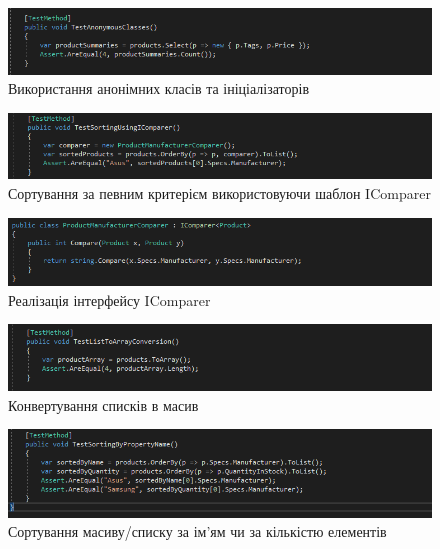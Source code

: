 \documentclass[oneside,14pt]{extarticle}
\begin{document}
\begin{normalsize}
	\begin{figure}[H]
		\centering
		\includegraphics[width=\textwidth]{5}
		\caption{Використання анонімних класів та ініціалізаторів}
	\end{figure}
	
	\begin{figure}[H]
		\centering
		\includegraphics[width=\textwidth]{6}
		\caption{Сортування за певним критерієм використовуючи шаблон IComparer}
	\end{figure}
	
	\begin{figure}[H]
		\centering
		\includegraphics[width=\textwidth]{62}
		\caption{Реалізація інтерфейсу IComparer}
	\end{figure}
	
	\begin{figure}[H]
		\centering
		\includegraphics[width=\textwidth]{7}
		\caption{Конвертування списків в масив}
	\end{figure}
	\begin{figure}[H]
		\centering
		\includegraphics[width=\textwidth]{8}
		\caption{Сортування масиву/списку за ім’ям чи за кількістю елементів}
	\end{figure}
	

\end{normalsize}
\end{document}
